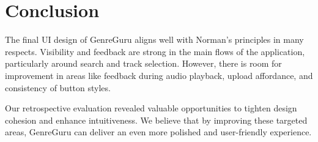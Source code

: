 \documentclass[12pt]{article}
\begin{document}
\section*{Conclusion}
The final UI design of GenreGuru aligns well with Norman's principles in many respects. Visibility and feedback are strong in the main flows of the application, particularly around search and track selection. However, there is room for improvement in areas like feedback during audio playback, upload affordance, and consistency of button styles.

Our retrospective evaluation revealed valuable opportunities to tighten design cohesion and enhance intuitiveness. We believe that by improving these targeted areas, GenreGuru can deliver an even more polished and user-friendly experience.
\end{document}
